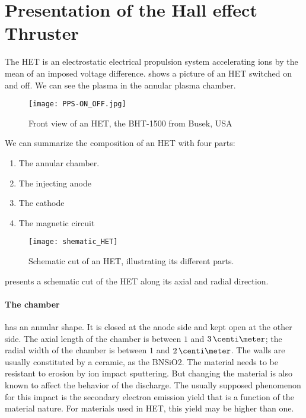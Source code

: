 

\section{Presentation of the Hall effect Thruster }
  \label{sec-HET}

  
  The \ac{HET} is an electrostatic electrical propulsion system accelerating ions by the mean of an imposed voltage difference.
   shows a picture of an \ac{HET} switched on and off.
  We can see the plasma in the annular plasma chamber.


  \begin{figure}[hbt]
    \centering
    \texttt{[image: PPS-ON\_OFF.jpg]}
    \caption{Front view of an \acs{HET}, the BHT-1500 from Busek, USA}
    \label{fig-bhtonoff}
  \end{figure}

  We can summarize the composition of an \ac{HET} with four parts\string:
  \begin{enumerate}
    \item The annular chamber.
    \item The injecting anode
    \item The cathode
    \item The magnetic circuit
  \end{enumerate}

  \begin{figure}[hbt]
    \centering
    \texttt{[image: shematic\_HET]}
    \caption{Schematic cut of an \acs{HET}, illustrating its different parts. }
    \label{fig-shematiccut}
  \end{figure}

   presents a schematic cut of the \ac{HET} along its axial and radial direction.

  \paragraph{The chamber} has an annular shape.
  It is closed at the anode side and kept open at the other side.
  The axial length of the chamber is between $1$ and $3\,\centi\meter$; the radial width of the chamber is between $1$ and $2\,\centi\meter$. 
  The walls are usually constituted by a ceramic, as the \ac{BNSiO2}.
  The material needs to be resistant to erosion by ion impact sputtering.
  But changing the material is also known to affect the behavior of the discharge.
  The usually supposed phenomenon for this impact is the secondary electron emission yield that is a function of the material nature.
  For materials used in HET, this yield may be higher than one.


